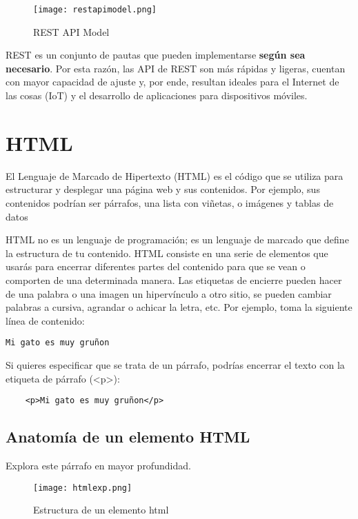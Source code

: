 \begin{figure}[H]
	\center
	\texttt{[image: restapimodel.png]}
	\caption{REST API Model}
	\label{fig:super}
\end{figure}

REST es un conjunto de pautas que pueden implementarse \textbf{según sea necesario}. Por esta razón, las API de REST son más rápidas y ligeras, cuentan con mayor capacidad de ajuste y, por ende, resultan ideales para el Internet de las cosas (IoT) y el desarrollo de aplicaciones para dispositivos móviles. 

\section{HTML}

\cite{mdn} El Lenguaje de Marcado de Hipertexto (HTML) es el código que se utiliza para estructurar y desplegar una página web y sus contenidos. Por ejemplo, sus contenidos podrían ser párrafos, una lista con viñetas, o imágenes y tablas de datos

HTML no es un lenguaje de programación; es un lenguaje de marcado que define la estructura de tu contenido. HTML consiste en una serie de elementos que usarás para encerrar diferentes partes del contenido para que se vean o comporten de una determinada manera. Las etiquetas de encierre pueden hacer de una palabra o una imagen un hipervínculo a otro sitio, se pueden cambiar palabras a cursiva, agrandar o achicar la letra, etc. Por ejemplo, toma la siguiente línea de contenido:

\begin{lstlisting}
Mi gato es muy gruñon
\end{lstlisting}

Si quieres especificar que se trata de un párrafo, podrías encerrar el texto con la etiqueta de párrafo (<p>):

\begin{lstlisting}
	<p>Mi gato es muy gruñon</p>
\end{lstlisting}

\subsection{Anatomía de un elemento HTML}
Explora este párrafo en mayor profundidad.

\begin{figure}[H]
	\center
	\texttt{[image: htmlexp.png]}
	\caption{Estructura de un elemento html}
\end{figure}

